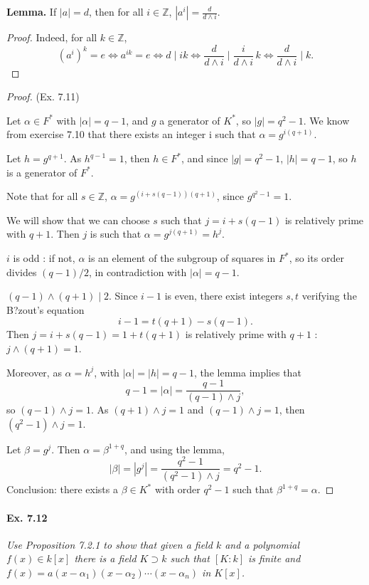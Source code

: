 \documentclass[11pt,a4paper]{article}
\newcommand{\Z}{\mathbb{Z}}
\begin{document}
{\bf Lemma.} If $|a| = d$, then for all $i \in \Z$, $| a^i | = \frac{d}{d\wedge i}$.
\begin{proof}
Indeed, for all $k \in \Z$,
$$(a^i)^k=e \iff a^{ik}=e \iff d \mid ik \iff \frac{d}{d \wedge i} \mid \frac{i}{d \wedge i}\,k \iff \frac{d}{d \wedge i} \mid k.$$
\end{proof}
\begin{proof}(Ex. 7.11)

Let $\alpha \in F^*$ with $|\alpha| = q-1$, and $g$ a generator of $K^*$, so $|g| = q^2-1$. We know from exercise 7.10 that there exists an integer i such that $\alpha = g^{i(q+1)}$.

Let $h = g^{q+1}$. As $h^{q-1} = 1$, then $h \in F^*$, and since $|g| = q^2-1$, $|h| = q-1$, so $h$ is a generator of $F^*$.

Note that for all $s\in \Z$, $\alpha = g^{(i+s(q-1))(q+1)}$, since $g^{q^2-1} = 1$.

We will show that we can choose $s$ such that $j = i +s(q-1)$ is relatively prime with $q+1$. Then  $j$ is such that $\alpha = g^{j(q+1)} = h^j$.


$i$ is odd : if not, $\alpha$ is an element of the subgroup of squares in $F^*$, so its order divides $(q-1)/2$, in contradiction with $|\alpha| = q-1$.

 $(q-1)\wedge (q+1) \mid 2$. Since $i-1$ is even, there exist integers $s,t$ verifying the B?zout's equation
$$i-1 = t(q+1)-s(q-1).$$
Then $j = i+s(q-1) = 1 + t(q+1)$ is relatively prime with $q+1$ : $j \wedge (q+1) = 1$.

Moreover, as $\alpha = h^j$, with $|\alpha| = |h| = q-1$, the lemma implies that
$$q-1 = |\alpha| = \frac{q-1}{(q-1)\wedge j},$$
so $(q-1) \wedge j = 1$.
As $(q+1) \wedge j = 1$ and $(q-1) \wedge j = 1$, then $(q^2-1) \wedge j = 1$.

Let $\beta = g^j$. Then $\alpha = \beta^{1+q}$, and using the lemma,
$$|\beta| = |g^j| = \frac{q^2-1}{(q^2-1)\wedge j} = q^2-1.$$
Conclusion:  there exists a $\beta \in K^*$ with order $q^2-1$ such that $\beta^{1+q} = \alpha$.
\end{proof}

\paragraph{Ex. 7.12}

{\it Use Proposition 7.2.1 to show that given a field $k$ and a polynomial $f(x) \in k[x]$ there is a field $K\supset k$ such that $[K:k]$ is finite and $f(x) = a(x-\alpha_1)(x-\alpha_2)\cdots(x-\alpha_n)$ in $K[x]$.
}
\end{document}
